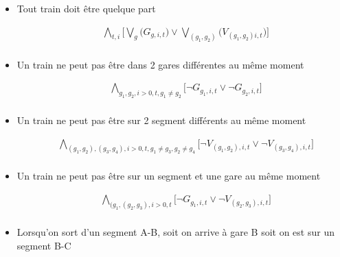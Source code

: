 \documentclass[a4paper]{article}
\begin{document}
\begin{itemize}

\item Tout train doit être quelque part

\begin{equation*}
    \begin{split}
      & \bigwedge_{t, i}
      \big[\bigvee_{g} \big(G_{g, i, t} \big) \lor \bigvee_{(g_1, g_2)} \big(V_{(g_1, g_2) i, t} \big) \big] \\
    \end{split}
    \end{equation*}


\item Un train ne peut pas être dans 2 gares différentes au même moment

\begin{equation*}
    \begin{split}
      & \bigwedge_{g_1, g_2, i>0, t, g_1 \neq g_2 }
      \big[\neg G_{g_1, i, t} \lor \neg G_{g_2, i, t} \big] \\
    \end{split}
    \end{equation*}
    
\item Un train ne peut pas être sur 2 segment différents au même moment

\begin{equation*}
    \begin{split}
      & \bigwedge_{(g_1, g_2), (g_3, g_4), i>0, t, g_1 \neq g_3, g_2 \neq g_4 }
      \big[\neg V_{(g_1, g_2), i, t} \lor \neg V_{(g_3, g_4), i, t} \big] \\
    \end{split}
    \end{equation*}

\item Un train ne peut pas être sur un segment et une gare au même moment

\begin{equation*}
    \begin{split}
      & \bigwedge_{(g_1, (g_2, g_3), i>0, t}
      \big[\neg G_{g_1, i, t} \lor \neg V_{(g_2, g_3), i, t} \big] \\
    \end{split}
    \end{equation*}


\item Lorsqu'on sort d'un segment A-B, soit on arrive à gare B soit on est sur un segment B-C


\end{itemize}
\end{document}
